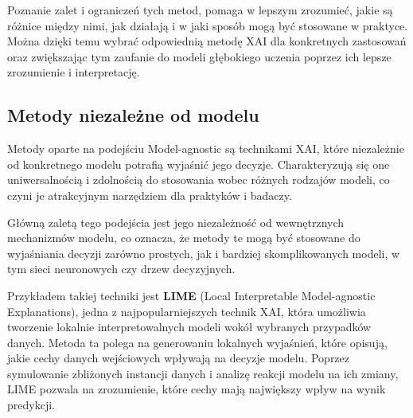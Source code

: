 Poznanie zalet i ograniczeń tych metod, pomaga w lepszym zrozumieć, jakie są różnice między nimi, jak działają i w jaki sposób mogą być stosowane w praktyce.
Można dzięki temu wybrać odpowiednią metodę XAI dla konkretnych zastosowań oraz zwiększając tym zaufanie do modeli głębokiego uczenia poprzez ich lepsze zrozumienie i interpretację.

\subsection*{Metody niezależne od modelu}
Metody oparte na podejściu Model-agnostic są technikami XAI, które niezależnie od konkretnego modelu potrafią wyjaśnić jego decyzje.
Charakteryzują się one uniwersalnością i zdolnością do stosowania wobec różnych rodzajów modeli, co czyni je atrakcyjnym narzędziem dla praktyków i badaczy.

Główną zaletą tego podejścia jest jego niezależność od wewnętrznych mechanizmów modelu, co oznacza, że metody te mogą być stosowane do wyjaśniania decyzji zarówno prostych, jak i bardziej skomplikowanych modeli, w tym sieci neuronowych czy drzew decyzyjnych.

Przykładem takiej techniki jest \textbf{LIME} (Local Interpretable Model-agnostic Explanations)\cite{ribeiro2016why, LIMEwhy}, jedna z najpopularniejszych technik XAI, która umożliwia tworzenie lokalnie interpretowalnych modeli wokół wybranych przypadków danych.
Metoda ta polega na generowaniu lokalnych wyjaśnień, które opisują, jakie cechy danych wejściowych wpływają na decyzje modelu.
Poprzez symulowanie zbliżonych instancji danych i analizę reakcji modelu na ich zmiany, LIME pozwala na zrozumienie, które cechy mają największy wpływ na wynik predykcji.

